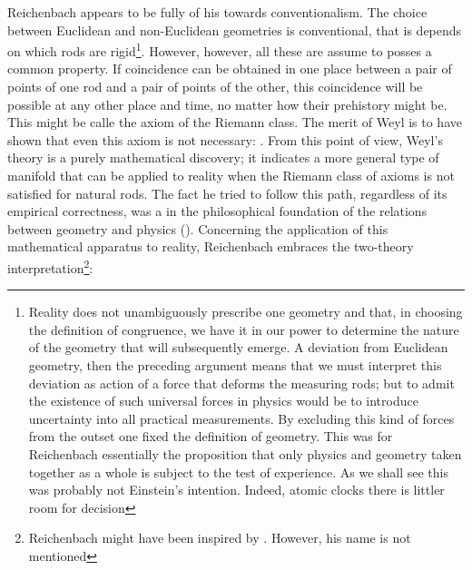 \documentclass[draft]{article}
\begin{document}
Reichenbach appears to be fully of his towards conventionalism. The choice between Euclidean and non-Euclidean geometries is conventional, that is depends on which rods are rigid\footnote{Reality does not unambiguously prescribe one geometry and that, in choosing the definition of congruence, we have it in our power to determine the nature of the geometry that will subsequently emerge. A deviation from Euclidean geometry, then the preceding argument means that we must interpret this deviation as action of a force that deforms the measuring rods; but to admit the existence of such universal forces in physics would be to introduce uncertainty into all practical measurements. By excluding this kind of forces from the outset one fixed the definition of geometry. This was for Reichenbach essentially the proposition that only physics and geometry taken together as a whole is subject to the test of experience. As we shall see this was probably not Einstein's intention. Indeed, atomic clocks there is littler room for decision}. However, however, all these  are assume to posses a common property. If  coincidence can be obtained in one place between a pair of points of one rod and a pair of points of the other, this coincidence will be possible at any other place and time, no matter how their prehistory might be. This might be calle the axiom of the Riemann class. The merit of Weyl is to have shown that even this axiom is not necessary:  \citep[365]{Reichenbach1922a}. From this point of view, Weyl's theory is a purely mathematical discovery; it indicates a more general type of manifold that can be applied to reality when the Riemann class of axioms is not satisfied for natural rods. The fact he tried to follow this path, regardless of its empirical correctness, was a  in the philosophical foundation of the relations between geometry and physics (\citealp[367f.]{Reichenbach1921}). Concerning the application of this mathematical apparatus to reality, Reichenbach embraces the two-theory interpretation\footnote{Reichenbach might have been inspired by \citet{Pauli1921}. However, his name is not mentioned}:

\end{document}

